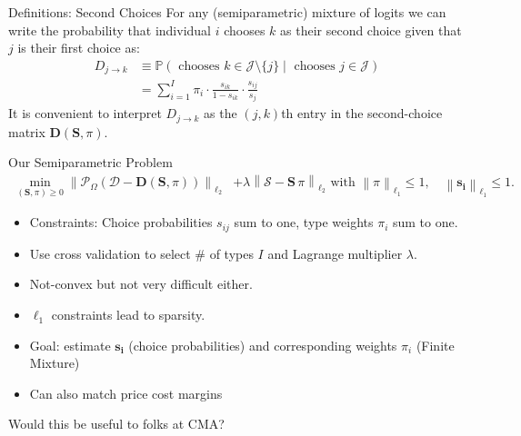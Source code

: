 \begin{frame}{Definitions: Second Choices}
For any (semiparametric) mixture of logits we can write the probability that individual $i$ chooses $k$ as their \alert{second choice} given that $j$ is their first choice as:
\begin{align*}
D_{j \rightarrow k} & \equiv \mathbb{P}(\text{ chooses } k \in \mathcal{J} \setminus \{j\} \mid
\text{ chooses } j \in \mathcal{J} )\\
&= \sum_{i=1}^I \pi_i \cdot \frac{s_{ik}}{1-s_{ik}} \cdot \frac{s_{ij}}{s_j}
\end{align*}
It is convenient to interpret $D_{j \rightarrow k}$ as the $(j,k)$th entry in the second-choice matrix $\mathbf{D}(\mathbf{S},\pi)$.
\end{frame}




\begin{frame}{Our Semiparametric Problem}
\small
\begin{align*}
\min _{(\mathbf{S}, \pi) \geq 0} \left\|\mathcal{P}_{\Omega}(\mathcal{D}-\mathbf{D}(\mathbf{S},\pi))\right\|_{\ell_2}  &+ \lambda \left\|\mathcal{S}- \mathbf{S}\,\pi \right\|_{\ell_2} \text { with } \left\|\pi  \right\|_{\ell_1} \leq 1, \quad   \left\|\mathbf{s_i}  \right\|_{\ell_1} \leq 1.
\end{align*}
\vspace{-.25cm}
\begin{itemize}
    \item Constraints: Choice probabilities $s_{ij}$ sum to one, type weights $\pi_i$ sum to one.
\item Use cross validation to select \# of types $I$ and Lagrange multiplier $\lambda$.
\item Not-convex but not very difficult either.
\item $\ell_1$ constraints lead to \alert{sparsity}.
\item Goal: estimate $\mathbf{s_i}$ (choice probabilities) and corresponding weights $\pi_i$ (Finite Mixture)
\item Can also match \alert{price cost margins}
\end{itemize}
Would this be useful to folks at CMA?
\end{frame}



